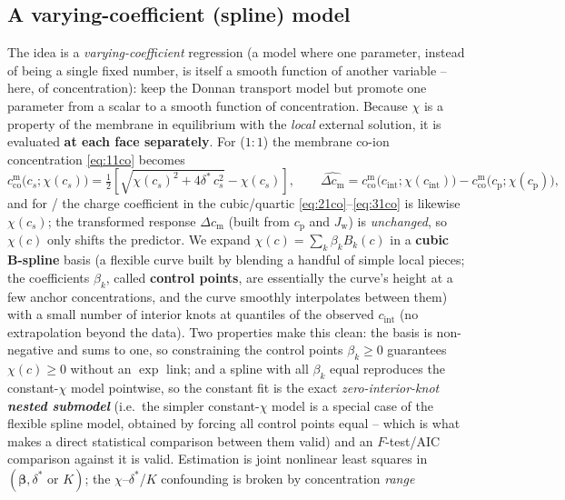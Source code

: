 \documentclass[11pt]{article}
\newcommand{\cm}[1]{{c^{\mathrm{m}}_{#1}}}
\newcommand{\co}{\mathrm{co}}
\newcommand{\Jw}{J_{\mathrm{w}}}
\newcommand{\dstar}{\delta^{*}}
\newcommand{\cint}{c_{\mathrm{int}}}
\newcommand{\cp}{c_{\mathrm{p}}}
\begin{document}
\subsection{A varying-coefficient (spline) model}\label{sec:chispline-model}
The idea is a \emph{varying-coefficient} regression (a model where one
parameter, instead of being a single fixed number, is itself a smooth
function of another variable -- here, of concentration): keep the Donnan
transport
model but promote one parameter from a scalar to a smooth function of
concentration. Because $\chi$ is a property of the membrane in equilibrium with
the \emph{local} external solution, it is evaluated \textbf{at each face
separately}. For  ($1{:}1$) the membrane co-ion concentration
\eqref{eq:11co} becomes
\begin{equation}
  \cm{\co}\big(c_s;\chi(c_s)\big)=\tfrac12\!\left[\sqrt{\chi(c_s)^2+4\dstar\,c_s^2}-\chi(c_s)\right],
  \qquad
  \widehat{\Delta c_{\mathrm m}} = \cm{\co}\big(\cint;\chi(\cint)\big)-\cm{\co}\big(\cp;\chi(\cp)\big),
  \label{eq:chispline-mean}
\end{equation}
and for / the charge coefficient in the cubic/quartic
\eqref{eq:21co}--\eqref{eq:31co} is likewise $\chi(c_s)$; the transformed
response $\Delta c_{\mathrm m}$ (built from $\cp$ and $\Jw$) is \emph{unchanged},
so $\chi(c)$ only shifts the predictor. We expand $\chi(c)=\sum_k\beta_k B_k(c)$
in a \textbf{cubic B-spline} basis (a flexible curve built by blending a
handful of simple local pieces; the coefficients $\beta_k$, called
\textbf{control points}, are essentially the curve's height at a few anchor
concentrations, and the curve smoothly interpolates between them) with a
small number of interior knots at
quantiles of the observed $\cint$ (no extrapolation beyond the data). Two
properties make this clean: the basis is non-negative and sums to one, so
constraining the control points $\beta_k\ge0$ guarantees $\chi(c)\ge0$ without an
$\exp$ link; and a spline with all $\beta_k$ equal reproduces the constant-$\chi$
model pointwise, so the constant fit is the exact \emph{zero-interior-knot
\textbf{nested submodel}} (i.e.\ the simpler constant-$\chi$ model is a
special case of the flexible spline model, obtained by forcing all control
points equal -- which is what makes a direct statistical comparison between
them valid)
and an $F$-test/AIC comparison against it is valid. Estimation is joint
nonlinear least squares in $(\boldsymbol\beta,\dstar\text{ or }K)$; the
$\chi$--$\dstar$/$K$ confounding is broken by concentration \emph{range}
\end{document}
